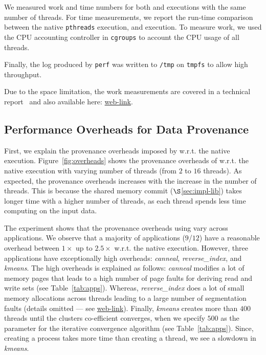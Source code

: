  We measured work and time numbers for both \pthreads and \projecttitle executions with the same number of threads. For time measurements, we report the run-time comparison between the native {\tt pthreads} execution, and \projecttitle execution.   To measure work, we used the CPU accounting controller in {\tt cgroups} to account the CPU usage of all threads. 

Finally, the log produced by
{\tt perf} was written to {\tt /tmp} on {\tt tmpfs} to allow high throughput.



  Due to the space limitation, the work measurements are covered in a technical report~\cite{inspector-techreport} and also available here: \href{https://mic92.github.io/inspector/index.html}{web-link}.





\subsection{Performance Overheads for Data Provenance}
\label{subsec:overheads}

First, we explain the provenance overheads imposed by \projecttitle w.r.t. the native \pthreads execution. Figure~\ref{fig:overheads} shows the provenance overheads of \projecttitle w.r.t. the native \pthreads execution with varying number of
threads (from $2$ to $16$ threads). As expected, the provenance overheads increases with the increase in the number of threads. This is because the shared memory commit ($\S$\ref{sec:impl-lib}) takes longer time with a higher number of threads, as each thread spends less time computing on the input data.  



The experiment shows that the provenance overheads using \projecttitle vary across applications. 
We observe that a majority of applications ($9$/$12$) have a reasonable overhead between $1\times$ up to $2.5\times$ w.r.t. the native execution. However, three applications have exceptionally high overheads:  {\em canneal}, {\em reverse\_index}, and {\em kmeans}. The high overheads is explained as follows: {\em canneal} modifies a lot of memory pages that leads to a high number of page faults for deriving read and write sets (see Table~\ref{tab:apps}). Whereas, {\em reverse\_index} does a lot of small memory allocations across threads leading to a large number of segmentation faults 
(details omitted --- see  \href{https://mic92.github.io/inspector/index.html\#measurement_table}{web-link}).  Finally, {\em kmeans} creates more than $400$ threads until the clusters co-efficient converges, when we specify $500$ as the parameter for the iterative convergence algorithm (see Table~\ref{tab:apps}). Since, creating a process takes more time than creating a thread, we see a slowdown in {\em kmeans}.


